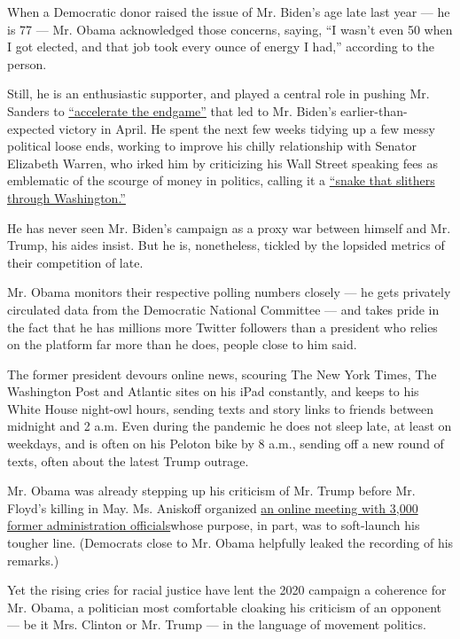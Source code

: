 When a Democratic donor raised the issue of Mr. Biden's age late last
year --- he is 77 --- Mr. Obama acknowledged those concerns, saying, ``I
wasn't even 50 when I got elected, and that job took every ounce of
energy I had,'' according to the person.

Still, he is an enthusiastic supporter, and played a central role in
pushing Mr. Sanders to
\href{https://www.nytimes.com/2020/04/14/us/politics/obama-biden-democratic-primary.html}{``accelerate
the endgame''} that led to Mr. Biden's earlier-than-expected victory in
April. He spent the next few weeks tidying up a few messy political
loose ends, working to improve his chilly relationship with Senator
Elizabeth Warren, who irked him by criticizing his Wall Street speaking
fees as emblematic of the scourge of money in politics, calling it a
\href{https://www.masslive.com/opinion/2017/04/warren_is_right_about_speaking.html}{``snake
that slithers through Washington.''}

He has never seen Mr. Biden's campaign as a proxy war between himself
and Mr. Trump, his aides insist. But he is, nonetheless, tickled by the
lopsided metrics of their competition of late.

Mr. Obama monitors their respective polling numbers closely --- he gets
privately circulated data from the Democratic National Committee --- and
takes pride in the fact that he has millions more Twitter followers than
a president who relies on the platform far more than he does, people
close to him said.

The former president devours online news, scouring The New York Times,
The Washington Post and Atlantic sites on his iPad constantly, and keeps
to his White House night-owl hours, sending texts and story links to
friends between midnight and 2 a.m. Even during the pandemic he does not
sleep late, at least on weekdays, and is often on his Peloton bike by 8
a.m., sending off a new round of texts, often about the latest Trump
outrage.

Mr. Obama was already stepping up his criticism of Mr. Trump before Mr.
Floyd's killing in May. Ms. Aniskoff organized
\href{https://www.nytimes.com/2020/05/09/us/politics/obama-flynn-coronavirus-trump.html}{an
online meeting with 3,000 former administration officials}whose purpose,
in part, was to soft-launch his tougher line. (Democrats close to Mr.
Obama helpfully leaked the recording of his remarks.)

Yet the rising cries for racial justice have lent the 2020 campaign a
coherence for Mr. Obama, a politician most comfortable cloaking his
criticism of an opponent --- be it Mrs. Clinton or Mr. Trump --- in the
language of movement politics.

